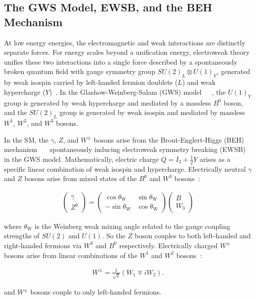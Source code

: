 \subsection{The GWS Model, EWSB, and the BEH Mechanism}
At low energy energies, the electromagnetic and weak interactions are distinctly separate forces.
For energy scales beyond a unification energy, electroweak theory unifies these two interactions into a single force described by a spontaneously broken quantum field with gauge symmetry group $SU(2)_L \otimes U(1)_Y$, generated by weak isospin carried by left-handed fermion doublets ($L$) and weak hypercharge ($Y$)~\cite{nagashima_2013_V2}.
In the Glashow-Weinberg-Salam (GWS) model~\cite{GLASHOW1961579}~\cite{PhysRevLett.19.1264}~\cite{doi:10.1142/9789812795915_0034}, the $U(1)_Y$ group is generated by weak hypercharge and mediated by a massless $B^0$ boson, and the $SU(2)_L$ group is generated by weak isospin and mediated by massless $W^1$, $W^2$, and $W^3$ bosons.

In the SM, the $\gamma$, $Z$, and $W^\pm$ bosons arise from the Brout-Englert-Higgs (BEH) mechanism~\cite{HIGGS1964132}~\cite{PhysRevLett.13.508}~\cite{PhysRevLett.13.321} spontaneously inducing electroweak symmetry breaking (EWSB) in the GWS model.
Mathematically, electric charge $Q = I_3 + \frac{1}{2} Y$ arises as a specific linear combination of weak isospin and hypercharge.
Electrically neutral $\gamma$ and $Z$ bosons arise from mixed states of the $B^0$ and $W^3$ bosons~\cite{nagashima_2013_V2}:
\begin{linenomath*}
\begin{align}
\left(\begin{array}{c}
\gamma \\
Z^0
\end{array}\right)=\left(\begin{array}{cc}
\cos \theta_{\mathrm{W}} & \sin \theta_{\mathrm{W}} \\
-\sin \theta_{\mathrm{W}} & \cos \theta_{\mathrm{W}}
\end{array}\right)\left(\begin{array}{c}
B \\
W_3
\end{array}\right)
\label{}
\end{align}
\end{linenomath*}
where $\theta_{\mathrm{W}}$ is the Weinberg weak mixing angle related to the gauge coupling strengths of $SU(2)$ and $U(1)$.
So the $Z$ boson couples to both left-handed and right-handed fermions via $W^3$ and $B^0$ respectively.
Electrically charged $W^\pm$ bosons arise from linear combinations of the $W^1$ and $W^2$ bosons~\cite{nagashima_2013_V2}:
\begin{linenomath*}
\begin{align}
W^{\pm}=\frac{1}{\sqrt{2}}\left(W_1 \mp i W_2\right).
\end{align}
\end{linenomath*}
and $W^\pm$ bosons couple to only left-handed fermions.

